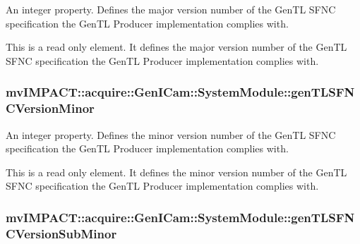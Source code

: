 An integer property. Defines the major version number of the Gen\+T\+L S\+F\+N\+C specification the Gen\+T\+L Producer implementation complies with. 

This is a read only element. It defines the major version number of the Gen\+T\+L S\+F\+N\+C specification the Gen\+T\+L Producer implementation complies with. \hypertarget{classmv_i_m_p_a_c_t_1_1acquire_1_1_gen_i_cam_1_1_system_module_ae852c6e9fe3e60c10184a5a8529c87ed}{
\subsubsection[{gen\+T\+L\+S\+F\+N\+C\+Version\+Minor}]{ mv\+I\+M\+P\+A\+C\+T\+::acquire\+::\+Gen\+I\+Cam\+::\+System\+Module\+::gen\+T\+L\+S\+F\+N\+C\+Version\+Minor}}\label{classmv_i_m_p_a_c_t_1_1acquire_1_1_gen_i_cam_1_1_system_module_ae852c6e9fe3e60c10184a5a8529c87ed}


An integer property. Defines the minor version number of the Gen\+T\+L S\+F\+N\+C specification the Gen\+T\+L Producer implementation complies with. 

This is a read only element. It defines the minor version number of the Gen\+T\+L S\+F\+N\+C specification the Gen\+T\+L Producer implementation complies with. \hypertarget{classmv_i_m_p_a_c_t_1_1acquire_1_1_gen_i_cam_1_1_system_module_afd11b3d1a0c1a59a0bf1b9762c0e8dfb}{
\subsubsection[{gen\+T\+L\+S\+F\+N\+C\+Version\+Sub\+Minor}]{ mv\+I\+M\+P\+A\+C\+T\+::acquire\+::\+Gen\+I\+Cam\+::\+System\+Module\+::gen\+T\+L\+S\+F\+N\+C\+Version\+Sub\+Minor}}\label{classmv_i_m_p_a_c_t_1_1acquire_1_1_gen_i_cam_1_1_system_module_afd11b3d1a0c1a59a0bf1b9762c0e8dfb}


